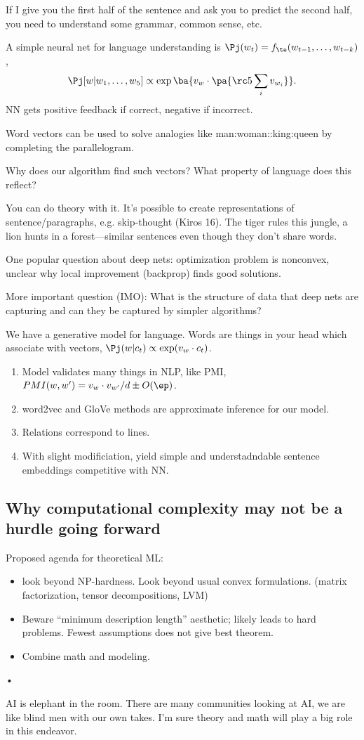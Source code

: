 If I give you the first half of the sentence and ask you to predict the second half, you need to understand some grammar, common sense, etc. 

A simple neural net for language understanding is $\Pj(w_t) = f_\te(w_{t-1},\ldots, w_{t-k})$, 
$$
\Pj[w|w_1,\ldots, w_5] \propto \exp\ba{v_w\cdot\pa{\rc 5 \sum_i v_{w_i}}}.
$$
NN gets positive feedback if correct, negative if incorrect.

Word vectors can be used to solve analogies like man:woman::king:queen by completing the parallelogram.

Why does our algorithm find such vectors? What property of language does this reflect?

You can do theory with it. It's possible to create representations of sentence/paragraphs, e.g. skip-thought (Kiros 16). The tiger rules this jungle, a lion hunts in a forest---similar sentences even though they don't share words.

One popular question about deep nets: optimization problem is nonconvex, unclear why local improvement (backprop) finds good solutions. %

More important question (IMO): What is the structure of data that deep nets are capturing and can they be captured by simpler algorithms?

We have a generative model for language. Words are things in your head which associate with vectors, $\Pj(w|c_t)\propto \exp(v_w\cdot c_t)$.

\begin{enumerate}
\item
Model validates many things in NLP, like PMI, $PMI(w,w')=v_w\cdot v_{w'}/d\pm O(\ep)$. 
\item
word2vec and GloVe methods are approximate inference for our model.
\item
Relations correspond to lines.
\item 
With slight modificiation, yield simple and understadndable sentence embeddings competitive with NN.
\end{enumerate}
\subsection{Why computational complexity may not be a hurdle going forward}

Proposed agenda for theoretical ML:
\begin{itemize}
\item
look beyond NP-hardness. Look beyond usual convex formulations. (matrix factorization, tensor decompositions, LVM)
\item
Beware ``minimum description length'' aesthetic; likely leads to hard problems. Fewest assumptions does not give best theorem.
\item
Combine math and modeling.
\end{itemize}•

AI is elephant in the room. There are many communities looking at AI, we are like blind men with our own takes. I'm sure theory and math will play a big role in this endeavor. 
